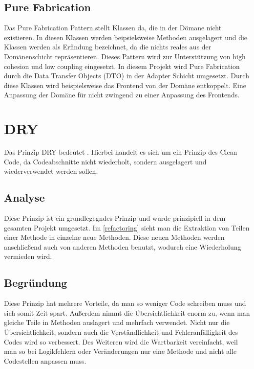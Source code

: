     \subsection{Pure Fabrication}
    Das Pure Fabrication Pattern stellt Klassen da, die in der Dömane nicht existieren. In diesen Klassen werden beipsielsweise Methoden ausgelagert und die Klassen werden als Erfindung bezeichnet, da die nichts reales aus der Domänenschicht repräsentieren. Dieses Pattern wird zur Unterstützung von high cohesion und low coupling eingesetzt. In diesem Projekt wird Pure Fabrication durch die Data Transfer Objects (DTO) in der Adapter Schicht umgesetzt. Durch diese Klassen wird beispielsweise das Frontend von der Domäne entkoppelt. Eine Anpassung der Domäne für nicht zwingend zu einer Anpassung des Frontends.

\section{DRY}
Das Prinzip DRY bedeutet . Hierbei handelt es sich um ein Prinzip des Clean Code, da Codeabschnitte nicht wiederholt, sondern ausgelagert und wiederverwendet werden sollen.

    \subsection{Analyse}
    Diese Prinzip ist ein grundlegegndes Prinzip und wurde prinzipiell in dem gesamten Projekt umgesetzt. Im \cref{refactoring} sieht man die Extraktion von Teilen einer Methode in einzelne neue Methoden. Diese neuen Methoden werden anschließend auch von anderen Methoden benutzt, wodurch eine Wiederholung vermieden wird.
    
    \subsection{Begründung}
    Diese Prinzip hat mehrere Vorteile, da man so weniger Code schreiben muss und sich somit Zeit spart. Außerdem nimmt die Übersichtlichkeit enorm zu, wenn man gleiche Teile in Methoden auslagert und mehrfach verwendet. Nicht nur die Übersichtlichkeit, sondern auch die Verständlichkeit und Fehleranfälligkeit des Codes wird so verbessert. Des Weiteren wird die Wartbarkeit vereinfacht, weil man so bei Logikfehlern oder Veränderungen nur eine Methode und nicht alle Codestellen anpassen muss.